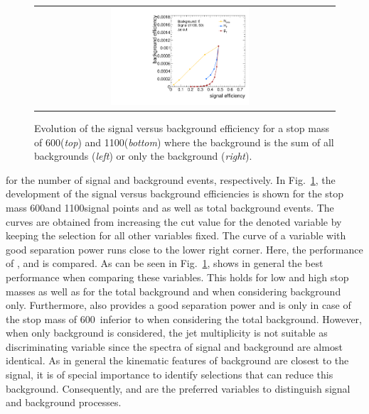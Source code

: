 \begin{figure}[!t]
{\begin{tabular}{cc}
                \includegraphics[width=0.49\textwidth]{figures/CutScan_DeltaPhiSelection_TTbar_powheg_13TeV_Stop1100_LSP50_T2tt_13TeV_HT_MET_MHT_NJets.pdf}
  \end{tabular}}
  \caption{Evolution of the signal versus background efficiency for a stop mass of 600\gev (\textit{top}) and 1100\gev (\textit{bottom}) where the background is the sum of all backgrounds (\textit{left}) or only the \ttbar background (\textit{right}).}
  \label{fig:stop_baseline_cutscan_ht_met_mht_njets}
\end{figure}
for the number of signal and background events, respectively. In Fig.~\ref{fig:stop_baseline_cutscan_ht_met_mht_njets}, the development of the signal versus background efficiencies is shown for the stop mass 600\gev and 1100\gev signal points and \ttbar as well as total background events. The curves are obtained from increasing the cut value for the denoted variable by keeping the selection for all other variables fixed. The curve of a variable with good separation power runs close to the lower right corner. Here, the performance of \HT, \met and \NJets is compared. %
As can be seen in Fig.~\ref{fig:stop_baseline_cutscan_ht_met_mht_njets}, \met shows in general the best performance when comparing these variables. This holds for low and high stop masses as well as for the total background and when considering \ttbar background only. Furthermore, also \HT provides a good separation power and is only in case of the stop mass of 600~\gev inferior to \NJets when considering the total background. However, when only \ttbar background is considered, the jet multiplicity is not suitable as discriminating variable since the \NJets spectra of signal and \ttbar background are almost identical. As in general the kinematic features of \ttbar background are closest to the signal, it is of special importance to identify selections that can reduce this background. Consequently, \met and \HT are the preferred variables to distinguish signal and background processes. \\
